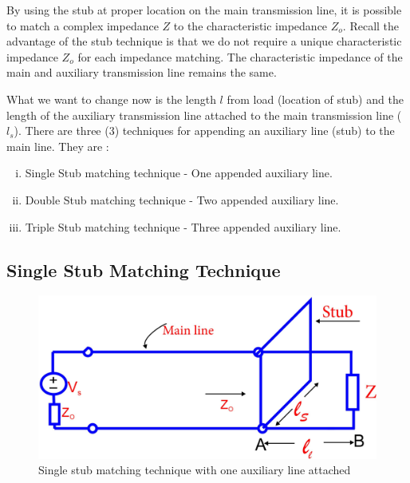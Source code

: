 By using the stub at proper location on the main transmission line, it is possible to match a complex impedance $Z$ to the characteristic impedance $Z_o$.
Recall the advantage of the stub technique is that we do not require a unique characteristic impedance $Z_o$ for each impedance matching. The characteristic impedance of the main and auxiliary transmission line remains the same.

What we want to change now is the length $l$ from load (location of stub) and the length of the auxiliary transmission line attached to the main transmission line ($l_s$). There are three (3) techniques for appending an auxiliary line (stub) to the main line. They are :
\begin{enumerate}[(i)]
\item Single Stub matching technique - One appended auxiliary line.
\item Double Stub matching technique - Two appended auxiliary line.
\item Triple Stub matching technique - Three appended auxiliary line.  
\end{enumerate} 
\subsection{Single Stub Matching Technique }
\begin{figure}[h]
\centering
\includegraphics[width=1\linewidth]{./graphics/fig11}
\caption{Single stub matching technique with one auxiliary line attached}
\end{figure}

